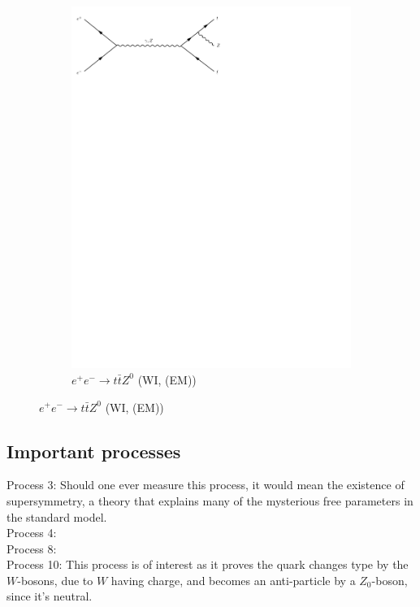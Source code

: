 \documentclass[11pt,a4paper]{article}
\begin{document}
\begin{figure}[h]
\begin{subfigure}[h]{0.3\textwidth}
		\includegraphics[trim={0.5cm 22cm 10cm 0cm},width=\textwidth]{../Diagrams/D20.pdf}
		\caption{$e^+e^- \rightarrow t\bar{t}Z^0$ (WI, (EM))}
		\label{fey:20}
	\end{subfigure}
\end{figure}

\subsection{Important processes}
Process 3: Should one ever measure this process, it would mean the existence of supersymmetry, a theory that explains many of the mysterious free parameters in the standard model.\\

Process 4: \\

Process 8: \\

Process 10: This process is of interest as it proves the quark changes type by the $W$-bosons, due to $W$ having charge, and becomes an anti-particle by a $Z_0$-boson, since it's neutral.\\
\end{document}
